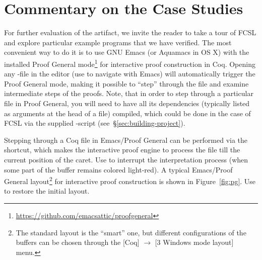 \section{Commentary on the Case Studies}
\label{sec:case-studies}

For further evaluation of the artifact, we invite the reader to take a
tour of FCSL and explore particular example programs that we have
verified. The most convenient way to do it is to use GNU Emacs (or
Aquamacs in OS X) with the installed Proof General
mode\footnote{\url{https://github.com/emacsattic/proofgeneral}} for
interactive proof construction in Coq. Opening any -file in
the editor (use  to navigate with Emacs) will
automatically trigger the Proof General mode, making it possible to
``step'' through the file and examine intermediate steps of the
proofs. Note, that in order to step through a particular file in Proof
General, you will need to have all its dependencies (typically listed
as  arguments at the head of a file) compiled,
which could be done in the case of FCSL via the supplied
-script (see~\S \ref{sec:building-project}).


Stepping through a Coq file in Emacs/Proof General can be performed
via the  shortcut, which makes the interactive
proof engine to process the file till the current position of the
caret. Use  to interrupt the interpretation
process (when some part of the buffer remains colored light-red). A
typical Emacs/Proof General layout\footnote{The standard layout is the
  ``{smart}'' one, but different configurations of the buffers can be
  chosen through the \textsf{[Coq] $\rightarrow$ [3 Windows mode
    layout]} menu.} for interactive proof construction is shown in
Figure~\ref{fig:pg}. Use  to restore the initial
layout.

